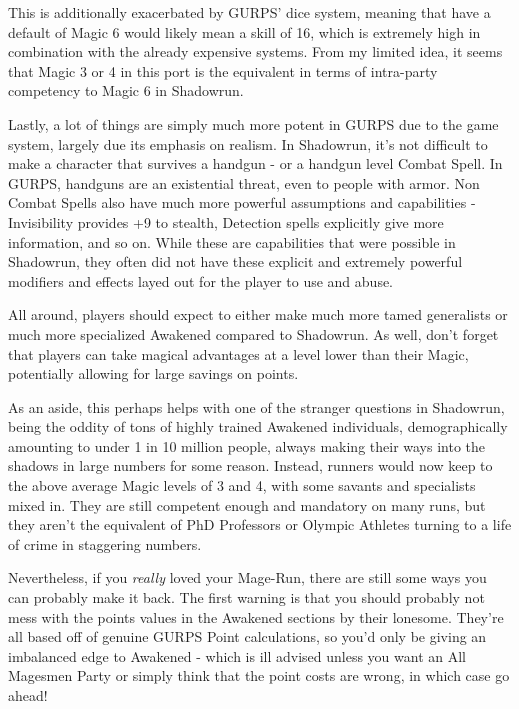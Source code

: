 \begin{multicols}{2}
	This is additionally exacerbated by GURPS' dice system, meaning that have a default of Magic 6 would likely mean a skill of 16, which is extremely high in combination with the already expensive systems. From my limited idea, it seems that Magic 3 or 4 in this port is the equivalent in terms of intra-party competency to Magic 6 in Shadowrun.
	
	Lastly, a lot of things are simply much more potent in GURPS due to the game system, largely due its emphasis on realism. In Shadowrun, it's not difficult to make a character that survives a handgun - or a handgun level Combat Spell. In GURPS, handguns are an existential threat, even to people with armor. Non Combat Spells also have much more powerful assumptions and capabilities - Invisibility provides +9 to stealth, Detection spells explicitly give more information, and so on. While these are capabilities that were possible in Shadowrun, they often did not have these explicit and extremely powerful modifiers and effects layed out for the player to use and abuse.
	
	All around, players should expect to either make much more tamed generalists or much more specialized Awakened compared to Shadowrun. As well, don't forget that players can take magical advantages at a level lower than their Magic, potentially allowing for large savings on points.
	
	As an aside, this perhaps helps with one of the stranger questions in Shadowrun, being the oddity of tons of highly trained Awakened individuals, demographically amounting to under 1 in 10 million people, always making their ways into the shadows in large numbers for some reason. Instead, runners would now keep to the above average Magic levels of 3 and 4, with some savants and specialists mixed in. They are still competent enough and mandatory on many runs, but they aren't the equivalent of PhD Professors or Olympic Athletes turning to a life of crime in staggering numbers.
	
	Nevertheless, if you \textit{really} loved your Mage-Run, there are still some ways you can probably make it back. The first warning is that you should probably not mess with the points values in the Awakened sections by their lonesome. They're all based off of genuine GURPS Point calculations, so you'd only be giving an imbalanced edge to Awakened - which is ill advised unless you want an All Magesmen Party or simply think that the point costs are wrong, in which case go ahead! 
	

\end{multicols}

